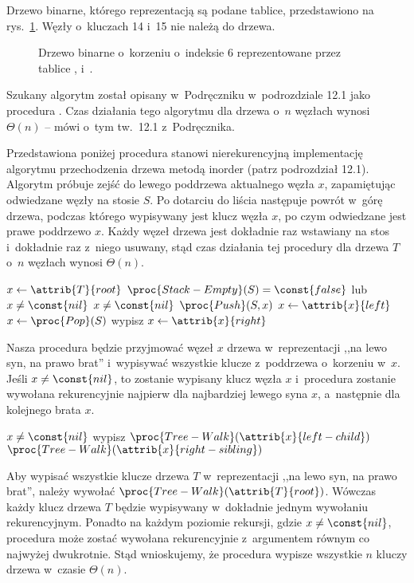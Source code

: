 
\exercise %
Drzewo binarne, którego reprezentacją są podane tablice, przedstawiono na rys.\ \ref{fig:10.4-1}.
Węzły o~kluczach 14 i~15 nie należą do drzewa.
\begin{figure}[!ht]
	\centering 
	\caption{Drzewo binarne o~korzeniu o~indeksie 6 reprezentowane przez tablice ,  i~.} \label{fig:10.4-1}
\end{figure}

\exercise %
Szukany algorytm został opisany w~Podręczniku w~podrozdziale 12.1 jako procedura .
Czas działania tego algorytmu dla drzewa o~$n$ węzłach wynosi $\Theta(n)$ -- mówi o~tym tw.\ 12.1 z~Podręcznika.

\exercise %
Przedstawiona poniżej procedura stanowi nierekurencyjną implementację algorytmu przechodzenia drzewa metodą inorder (patrz podrozdział 12.1).
Algorytm próbuje zejść do lewego poddrzewa aktualnego węzła $x$, zapamiętując odwiedzane węzły na stosie $S$.
Po dotarciu do liścia następuje powrót w~górę drzewa, podczas którego wypisywany jest klucz węzła $x$, po czym odwiedzane jest prawe poddrzewo $x$.
Każdy węzeł drzewa jest dokładnie raz wstawiany na stos i~dokładnie raz z~niego usuwany, stąd czas działania tej procedury dla drzewa $T$ o~$n$ węzłach wynosi $\Theta(n)$.
\begin{codebox}
\li	$x\gets\attrib{T}{root}$
\li	\While $\proc{Stack-Empty}(S)=\const{false}$ lub $x\ne\const{nil}$
\li		\Do \If $x\ne\const{nil}$
\li				\Then $\proc{Push}(S,x)$
\li					$x\gets\attrib{x}{left}$
\li				\Else $x\gets\proc{Pop}(S)$
\li					wypisz \attrib{x}{key}
\li					$x\gets\attrib{x}{right}$
				\End
		\End
\end{codebox}

\exercise %
Nasza procedura będzie przyjmować węzeł $x$ drzewa w~reprezentacji ,,na lewo syn, na prawo brat'' i~wypisywać wszystkie klucze z~poddrzewa o~korzeniu w~$x$.
Jeśli $x\ne\const{nil}$, to zostanie wypisany klucz węzła $x$ i~procedura zostanie wywołana rekurencyjnie najpierw dla najbardziej lewego syna $x$, a~następnie dla kolejnego brata $x$.
\begin{codebox}
\li	\If $x\ne\const{nil}$
\li		\Then wypisz 
\li			$\proc{Tree-Walk}(\attrib{x}{left-child})$
\li			$\proc{Tree-Walk}(\attrib{x}{right-sibling})$
		\End
\end{codebox}
Aby wypisać wszystkie klucze drzewa $T$ w~reprezentacji ,,na lewo syn, na prawo brat'', należy wywołać $\proc{Tree-Walk}(\attrib{T}{root})$.
Wówczas każdy klucz drzewa $T$ będzie wypisywany w~dokładnie jednym wywołaniu rekurencyjnym.
Ponadto na każdym poziomie rekursji, gdzie $x\ne\const{nil}$, procedura może zostać wywołana rekurencyjnie z~argumentem równym  co najwyżej dwukrotnie.
Stąd wnioskujemy, że procedura wypisze wszystkie $n$ kluczy drzewa w~czasie $\Theta(n)$.

